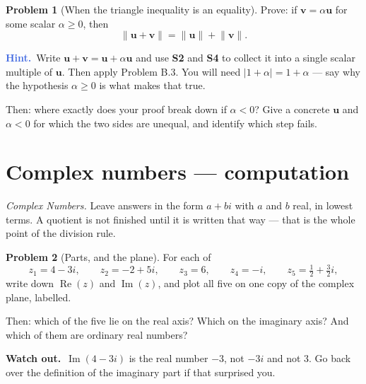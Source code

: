 \documentclass[11pt]{article}
\theoremstyle{definition}
\newtheorem{prob}{Problem}[section]
\newcommand{\heads}[1]{\par\smallskip\noindent
  {\small\sffamily\textcolor{BrickRed}{\textbf{Watch out.}}\ #1}\par\smallskip}
\newcommand{\hint}[1]{\par\smallskip\noindent
  {\small\sffamily\textcolor{RoyalBlue}{\textbf{Hint.}}\ #1}\par\smallskip}
\newcommand{\vc}[1]{\mathbf{#1}}
\newcommand{\norm}[1]{\lVert #1\rVert}
\newcommand{\Rez}{\operatorname{Re}}
\newcommand{\Imz}{\operatorname{Im}}
\begin{document}
\begin{prob}[When the triangle inequality is an equality]
Prove: if $\vc{v}=\alpha\vc{u}$ for some scalar $\alpha\ge 0$, then
\[
  \norm{\vc{u}+\vc{v}} = \norm{\vc{u}}+\norm{\vc{v}} .
\]

\hint{Write $\vc{u}+\vc{v}=\vc{u}+\alpha\vc{u}$ and use \textbf{S2} and
\textbf{S4} to collect it into a single scalar multiple of $\vc{u}$. Then apply
Problem B.3. You will need $\lvert 1+\alpha\rvert = 1+\alpha$ --- say why the
hypothesis $\alpha\ge0$ is what makes that true.}

\medskip
\noindent Then: where exactly does your proof break down if $\alpha<0$? Give a
concrete $\vc{u}$ and $\alpha<0$ for which the two sides are unequal, and
identify which step fails.
\end{prob}

\section{Complex numbers --- computation}
\emph{Complex Numbers.} Leave answers in the form $a+bi$ with $a$ and $b$ real,
in lowest terms. A quotient is not finished until it is written that way ---
that is the whole point of the division rule.

\begin{prob}[Parts, and the plane]
For each of
\[
  z_1 = 4-3i,\qquad
  z_2 = -2+5i,\qquad
  z_3 = 6,\qquad
  z_4 = -i,\qquad
  z_5 = \tfrac12 + \tfrac32 i ,
\]
write down $\Rez(z)$ and $\Imz(z)$, and plot all five on one copy of the complex
plane, labelled.

\medskip
\noindent Then: which of the five lie on the real axis? Which on the imaginary
axis? And which of them are ordinary real numbers?

\heads{$\Imz(4-3i)$ is the real number $-3$, not $-3i$ and not $3$. Go back over
the definition of the imaginary part if that surprised you.}
\end{prob}
\end{document}
